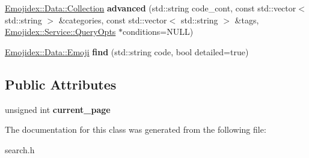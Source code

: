 \begin{DoxyCompactItemize}
\item 
\hyperlink{classEmojidex_1_1Data_1_1Collection}{Emojidex\+::\+Data\+::\+Collection} {\bfseries advanced} (std\+::string code\+\_\+cont, const std\+::vector$<$ std\+::string $>$ \&categories, const std\+::vector$<$ std\+::string $>$ \&tags, \hyperlink{classEmojidex_1_1Service_1_1QueryOpts}{Emojidex\+::\+Service\+::\+Query\+Opts} $\ast$conditions=N\+U\+LL)\hypertarget{classEmojidex_1_1Service_1_1Search_a2924585a8bb92c1b902477cabc154fb0}{}\label{classEmojidex_1_1Service_1_1Search_a2924585a8bb92c1b902477cabc154fb0}

\item 
\hyperlink{classEmojidex_1_1Data_1_1Emoji}{Emojidex\+::\+Data\+::\+Emoji} {\bfseries find} (std\+::string code, bool detailed=true)\hypertarget{classEmojidex_1_1Service_1_1Search_a80970b4a18e5bcc37a2a697de237e8aa}{}\label{classEmojidex_1_1Service_1_1Search_a80970b4a18e5bcc37a2a697de237e8aa}

\end{DoxyCompactItemize}
\subsection*{Public Attributes}
\begin{DoxyCompactItemize}
\item 
unsigned int {\bfseries current\+\_\+page}\hypertarget{classEmojidex_1_1Service_1_1Search_a8fe41d03f8c3013a021ad103c2ab4245}{}\label{classEmojidex_1_1Service_1_1Search_a8fe41d03f8c3013a021ad103c2ab4245}

\end{DoxyCompactItemize}


The documentation for this class was generated from the following file\+:\begin{DoxyCompactItemize}
\item 
search.\+h\end{DoxyCompactItemize}
